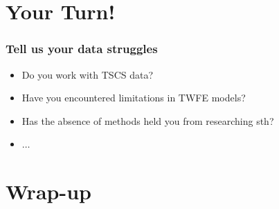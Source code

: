 \documentclass[12pt,aspectratio=169]{beamer}\usepackage[]{graphicx}\usepackage[]{xcolor}
\begin{document}

\section{Your Turn!}


\begin{frame}
\frametitle{Tell us your data struggles}

    \begin{alertblock}{}

    \begin{itemize}
        \item Do you work with TSCS data?
        \item Have you encountered limitations in TWFE models?
        \item Has the absence of methods held you from researching sth?
        \item $\dots$ 
    \end{itemize}

    \end{alertblock}

\end{frame}


\section{Wrap-up}
\end{document}
